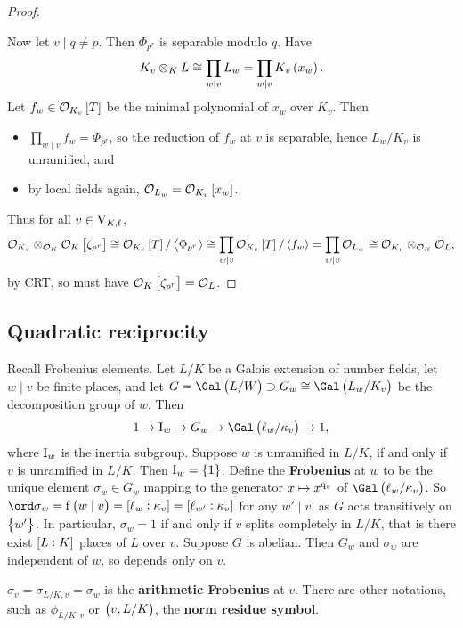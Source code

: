 \begin{proof}
\begin{itemize}
\end{itemize}
Now let $ v \mid q \ne p $. Then $ \Phi_{p^r} $ is separable modulo $ q $. Have
$$ K_v \otimes_K L \cong \prod_{w \mid v} L_w = \prod_{w \mid v} K_v\br{x_w}. $$
Let $ f_w \in \OOO_{K_v}\sbr{T} $ be the minimal polynomial of $ x_w $ over $ K_v $. Then
\begin{itemize}
\item $ \prod_{w \mid v} f_w = \Phi_{p^r} $, so the reduction of $ f_w $ at $ v $ is separable, hence $ L_w / K_v $ is unramified, and
\item by local fields again, $ \OOO_{L_w} = \OOO_{K_v}\sbr{x_w} $.
\end{itemize}

\pagebreak

Thus for all $ v \in \mathrm{V}_{K, \mathrm{f}} $,
$$ \OOO_{K_v} \otimes_{\OOO_K} \OOO_K\sbr{\zeta_{p^r}} \cong \OOO_{K_v}\sbr{T} / \abr{\Phi_{p^r}} \cong \prod_{w \mid v} \OOO_{K_v}\sbr{T} / \abr{f_w} = \prod_{w \mid v} \OOO_{L_w} \cong \OOO_{K_v} \otimes_{\OOO_K} \OOO_L, $$
by CRT, so must have $ \OOO_K\sbr{\zeta_{p^r}} = \OOO_L $.
\end{proof}

\subsection{Quadratic reciprocity}

Recall Frobenius elements. Let $ L / K $ be a Galois extension of number fields, let $ w \mid v $ be finite places, and let $ G = \Gal\br{L / W} \supset G_w \cong \Gal\br{L_w / K_v} $ be the decomposition group of $ w $. Then
$$ 1 \to \I_w \to G_w \to \Gal\br{\ell_w / \kappa_v} \to 1, $$
where $ \mathrm{I}_w $ is the inertia subgroup. Suppose $ w $ is unramified in $ L / K $, if and only if $ v $ is unramified in $ L / K $. Then $ \I_w = \cbr{1} $. Define the \textbf{Frobenius} at $ w $ to be the unique element $ \sigma_w \in G_w $ mapping to the generator $ x \mapsto x^{\mathrm{q}_v} $ of $ \Gal\br{\ell_w / \kappa_v} $. So $ \ord \sigma_w = \f\br{w \mid v} = \sbr{\ell_w : \kappa_v} = \sbr{\ell_{w'} : \kappa_v} $ for any $ w' \mid v $, as $ G $ acts transitively on $ \cbr{w'} $. In particular, $ \sigma_w = 1 $ if and only if $ v $ splits completely in $ L / K $, that is there exist $ \sbr{L : K} $ places of $ L $ over $ v $. Suppose $ G $ is abelian. Then $ G_w $ and $ \sigma_w $ are independent of $ w $, so depends only on $ v $.

\begin{notation*}
$ \sigma_v = \sigma_{L / K, v} = \sigma_w $ is the \textbf{arithmetic Frobenius} at $ v $. There are other notations, such as $ \phi_{L / K, v} $ or $ \br{v, L / K} $, the \textbf{norm residue symbol}.
\end{notation*}

